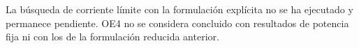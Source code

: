 La búsqueda de corriente límite con la formulación explícita no se ha ejecutado y permanece pendiente. OE4 no se considera concluido con resultados de potencia fija ni con los de la formulación reducida anterior.
